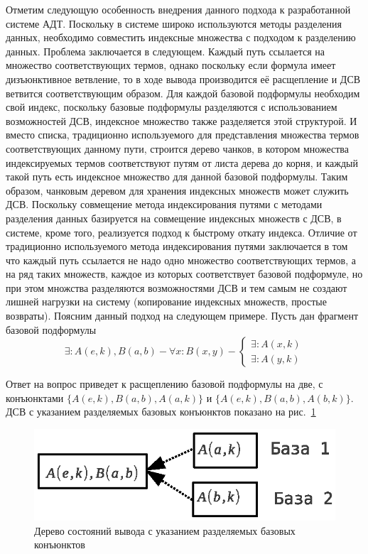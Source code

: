 Отметим следующую особенность внедрения данного подхода к разработанной системе АДТ. Поскольку в системе широко используются методы разделения данных, необходимо совместить индексные множества с подходом к разделению данных. Проблема заключается в следующем. Каждый путь ссылается на множество соответствующих термов, однако поскольку если формула имеет дизъюнктивное ветвление, то в ходе вывода производится её расщепление и ДСВ ветвится соответствующим образом. Для каждой базовой подформулы необходим свой индекс, поскольку базовые подформулы разделяются с использованием возможностей ДСВ, индексное множество также разделяется этой структурой. И вместо списка, традиционно используемого для представления множества термов соответствующих данному пути, строится дерево чанков, в котором множества индексируемых термов соответствуют путям от листа дерева до корня, и каждый такой путь есть индексное множество для данной базовой подформулы. Таким образом, чанковым деревом для хранения индексных множеств может служить ДСВ. Поскольку совмещение метода индексирования путями с методами разделения данных базируется на совмещение индексных множеств с ДСВ, в системе, кроме того, реализуется подход к быстрому откату индекса. Отличие от традиционно используемого метода индексирования путями заключается в том что каждый путь ссылается не надо одно множество соответствующих термов, а на ряд таких множеств, каждое из которых соответствует базовой подформуле, но при этом множства разделяются возможностями ДСВ и тем самым не создают лишней нагрузки на систему (копирование индексных множеств, простые возвраты). Поясним данный подход на следующем примере.
Пусть дан фрагмент базовой подформулы
$$
\exists: A(e,k),B(a,b) - \forall x: B(x,y) - \left\{
\begin{array}{lcl}
 \exists \colon A(x,k) \\
 \exists \colon A(y,k)
\end{array}
\right.
$$

Ответ на вопрос приведет к расщеплению базовой подформулы на две, с конъюнктами $\{A(e,k),B(a,b),A(a,k)\}$ и $\{A(e,k), B(a,b),A(b,k)\}$. ДСВ с указанием разделяемых базовых конъюнктов показано на рис.~\ref{fig:sharedindex}

\begin{figure}[h]
	\centering
	\includegraphics[width=0.4\linewidth]{pics/SharedIndex.eps}
	\caption{Дерево состояний вывода с указанием разделяемых базовых конъюнктов}
	\label{fig:sharedindex}
\end{figure}

